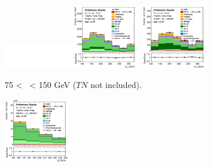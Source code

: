 \newpage
\vspace*{\fill} 


\begin{figure}[h!]
    \centering
    \begin{subfigure}[b]{\textwidth}
        \centering
        \includegraphics[width=0.32\textwidth]{Images/VH/Own_fit/blank.png}
        \includegraphics[width=0.32\textwidth]{Images/VH/Own_fit/postfit_VHcc/Region_distmBB_BMax150_BMin75_DCRHigh_J2_TTypelt_T2_L1_Y6051_GlobalFit_conditionnal_mu1.png}
        \includegraphics[width=0.32\textwidth]{Images/VH/Own_fit/postfit_VHcc/Region_distmBB_BMax150_BMin75_DCRHigh_J2_TTypett_T2_L1_Y6051_GlobalFit_conditionnal_mu1.png}
        \caption{75 < \ptv\ < 150 GeV ($TN$ not included).}
        \label{fig:plots_VHcc_1L_75_CRH_2J}
    \end{subfigure}
    \begin{subfigure}[b]{\textwidth}
        \centering
        \includegraphics[width=0.32\textwidth]{Images/VH/Own_fit/postfit_VHcc/Region_distpTV_BMax250_BMin150_DCRHigh_J2_TTypent_T1_L1_Y6051_GlobalFit_conditionnal_mu1.png}

\end{subfigure}
\end{figure}
